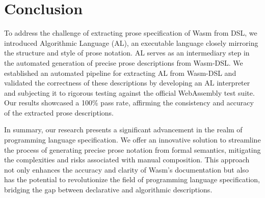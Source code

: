 \section{Conclusion}\label{sec:conclusion}
To address the challenge of extracting prose specification of Wasm from DSL, we
introduced Algorithmic Language (AL), an executable language closely mirroring
the structure and style of prose notation. AL serves as an intermediary step in
the automated generation of precise prose descriptions from Wasm-DSL. We
established an automated pipeline for extracting AL from Wasm-DSL and validated
the correctness of these descriptions by developing an AL interpreter and
subjecting it to rigorous testing against the official WebAssembly test suite.
Our results showcased a 100\% pass rate, affirming the consistency and accuracy
of the extracted prose descriptions.

In summary, our research presents a significant advancement in the realm of
programming language specification. We offer an innovative solution to
streamline the process of generating precise prose notation from formal
semantics, mitigating the complexities and risks associated with manual
composition. This approach not only enhances the accuracy and clarity of Wasm's
documentation but also has the potential to revolutionize the field of
programming language specification, bridging the gap between declarative and
algorithmic descriptions.

